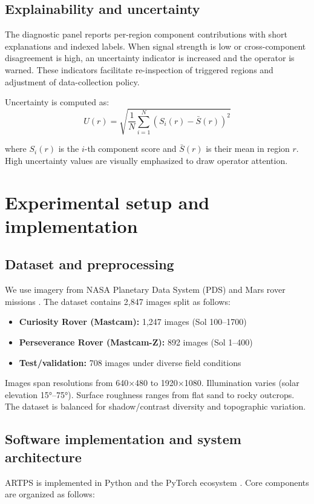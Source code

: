 \documentclass[12pt]{article}
\begin{document}
\subsection{Explainability and uncertainty}
The diagnostic panel reports per-region component contributions with short explanations and indexed labels. When signal strength is low or cross-component disagreement is high, an uncertainty indicator is increased and the operator is warned. These indicators facilitate re-inspection of triggered regions and adjustment of data-collection policy.

Uncertainty is computed as:
\[ U(r) = \sqrt{\frac{1}{N} \sum_{i=1}^{N} (S_i(r) - \bar{S}(r))^2} \]

where \(S_i(r)\) is the \(i\)-th component score and \(\bar{S}(r)\) is their mean in region \(r\). High uncertainty values are visually emphasized to draw operator attention.

\section{Experimental setup and implementation}
\subsection{Dataset and preprocessing}
We use imagery from NASA Planetary Data System (PDS) and Mars rover missions \cite{nasapds2023,curiosity2023,perseverance2023}. The dataset contains 2,847 images split as follows:

\begin{itemize}
\item \textbf{Curiosity Rover (Mastcam):} 1,247 images (Sol 100--1700)
\item \textbf{Perseverance Rover (Mastcam-Z):} 892 images (Sol 1--400)
\item \textbf{Test/validation:} 708 images under diverse field conditions
\end{itemize}

Images span resolutions from 640×480 to 1920×1080. Illumination varies (solar elevation 15°--75°). Surface roughness ranges from flat sand to rocky outcrops. The dataset is balanced for shadow/contrast diversity and topographic variation.

\subsection{Software implementation and system architecture}
ARTPS is implemented in Python and the PyTorch ecosystem \cite{pytorch2023}. Core components are organized as follows:
\end{document}
